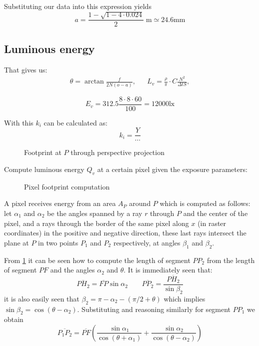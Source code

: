 Substituting our data into this expression yields
\begin{displaymath}
a = \frac{1-\sqrt{1 - 4 \cdot 0.024}}2 \;\unit{\meter} \simeq \num{24.6}\unit{\milli\meter}
\end{displaymath}

\ifomit
\subsection{Luminous energy}
That gives us:
\begin{align*}
\theta = \arctan\frac{f}{2N(o-a)}, && L_v = \frac{\rho}{\pi}\cdot
C\frac{N^2}{\Delta t S},
\end{align*}

\begin{displaymath}
E_v = 312.5\frac{8\cdot 8 \cdot 60}{100} = \num{12000}\unit{\lux}
\end{displaymath}


With this $k_i$ can be calculated as:
\begin{displaymath}
k_i = \frac{Y}{\cdots}
\end{displaymath}

\begin{figure}

\caption{Footprint at $P$ through perspective projection}
\end{figure}

Compute luminous energy $Q_v$ at a certain pixel given the exposure parameters:

\begin{figure}

\caption{Pixel footprint computation}
\label{fig:opposite-angle}
\end{figure}

A pixel receives energy from an area $A_P$ around $P$ which is computed as follows: let $\alpha_1$ and $\alpha_2$ be the angles spanned by a ray $r$ through $P$ and the center of the pixel, and a rays through the border of the same pixel along $x$ (in raster coordinates) in the positive and negative direction, these last rays intersect  the plane at $P$ in two points $P_1$ and $P_2$ respectively, at angles $\beta_1$ and $\beta_2$.

From \cref{fig:opposite-angle} it can be seen how to compute the length of segment $PP_2$ from the length of segment $PF$ and the angles $\alpha_2$ and $\theta$. It is immediately seen that:
\begin{displaymath}
\overline{PH_2} = \overline{FP}\sin\alpha_2 \qquad \overline{PP_2} = \frac{\overline{PH_2}}{\sin\beta_2}
\end{displaymath}
it is also easily seen that $\beta_2 = \pi - \alpha_2 - (\pi/2 + \theta)$ which implies $\sin\beta_2 = \cos(\theta-\alpha_2)$. Substituting and reasoning similarly for segment $PP_1$ we obtain
\begin{displaymath}
\overline{P_1P_2} = \overline{PF}
	\left(\frac{\sin\alpha_1}{\cos(\theta+\alpha_1)} +
	      \frac{\sin\alpha_2}{\cos(\theta-\alpha_2)}\right)
\end{displaymath}

